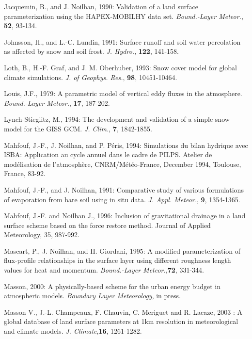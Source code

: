 \begin{description}
\item
Jacquemin, B., and J. Noilhan, 1990:
Validation of a land surface parameterization using the
HAPEX-MOBILHY data set.
{\em Bound.-Layer Meteor.},
{\bf 52},
93-134.

\item
Johnsson, H., and L.-C. Lundin, 1991:
Surface runoff and soil water percolation as affected by snow
and soil frost.
{\em J. Hydro.},
{\bf 122},
141-158.

\item
Loth, B.,
H.-F. Graf, and J. M. Oberhuber, 1993:
Snow cover model for global climate simulations.
{\em J. of Geophys. Res.},
{\bf 98},
10451-10464.

\item
Louis, J.F., 1979:
A parametric model of vertical eddy fluxes in the atmosphere.
{\em Bound.-Layer Meteor.},
{\bf 17},
187-202.

\item
Lynch-Stieglitz, M., 1994: The development and validation
of a simple snow model for the GISS GCM.
{\em J. Clim.},
{\bf 7},
1842-1855.

\item
Mahfouf, J.-F., J. Noilhan, and P. P\'eris, 1994:
Simulations du bilan hydrique avec ISBA:  Application
au cycle annuel dans le cadre de PILPS.
Atelier de mod\'elisation de l'atmosph\`ere,
CNRM/M\'et\'eo-France,
December 1994, Toulouse, France, 83-92.

\item
Mahfouf, J.-F., and J. Noilhan, 1991:
Comparative study of various formulations of evaporation
from bare soil using in situ data.
{\em J. Appl. Meteor.}, {\bf 9}, 1354-1365.

\item
Mahfouf, J.-F. and Noilhan J., 1996: Inclusion of gravitational drainage in a land surface scheme based on the force restore method. Journal of Applied Meteorology, 35, 987-992.

\item
Mascart, P., J. Noilhan, and H. Giordani, 1995:
A modified parameterization of flux-profile relationships
in the surface layer using different roughness length
values for heat and momentum.
{\em Bound.-Layer Meteor.},{\bf 72}, 331-344.

\item
Masson, 2000:
A physically-based scheme for the urban energy budget in atmospheric models.
{\it Boundary Layer Meteorology}, in press.

\item
Masson V., J.-L. Champeaux, F. Chauvin, C. Meriguet and R. Lacaze, 2003 : 
A global database of land surface parameters at 1km resolution in meteorological and climate models.
{\it J. Climate},{\bf 16}, 1261-1282.


\end{description}
